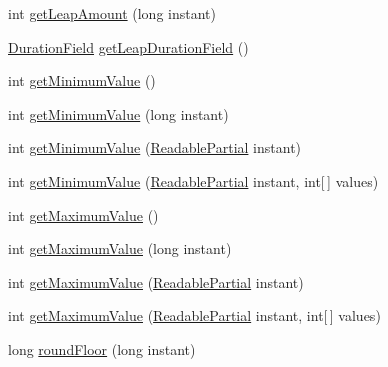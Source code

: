 \begin{DoxyCompactItemize}
\item 
int \hyperlink{classorg_1_1joda_1_1time_1_1field_1_1_zero_is_max_date_time_field_aa1d3542d95520b03b19518a8ac349bcf}{get\-Leap\-Amount} (long instant)
\item 
\hyperlink{classorg_1_1joda_1_1time_1_1_duration_field}{Duration\-Field} \hyperlink{classorg_1_1joda_1_1time_1_1field_1_1_zero_is_max_date_time_field_a1298f49bdc862df9959ef0637a5ca2a2}{get\-Leap\-Duration\-Field} ()
\item 
int \hyperlink{classorg_1_1joda_1_1time_1_1field_1_1_zero_is_max_date_time_field_ad7e9c4966783f6ac7ce0dce61a26dbc8}{get\-Minimum\-Value} ()
\item 
int \hyperlink{classorg_1_1joda_1_1time_1_1field_1_1_zero_is_max_date_time_field_aa6360ccef1e4208419d1f9a30b33a4b9}{get\-Minimum\-Value} (long instant)
\item 
int \hyperlink{classorg_1_1joda_1_1time_1_1field_1_1_zero_is_max_date_time_field_a9b5ef3ff3cfef568fb28818bc5bcbb70}{get\-Minimum\-Value} (\hyperlink{interfaceorg_1_1joda_1_1time_1_1_readable_partial}{Readable\-Partial} instant)
\item 
int \hyperlink{classorg_1_1joda_1_1time_1_1field_1_1_zero_is_max_date_time_field_a57b2addd5efaf0c10502f5ac20b919bb}{get\-Minimum\-Value} (\hyperlink{interfaceorg_1_1joda_1_1time_1_1_readable_partial}{Readable\-Partial} instant, int\mbox{[}$\,$\mbox{]} values)
\item 
int \hyperlink{classorg_1_1joda_1_1time_1_1field_1_1_zero_is_max_date_time_field_a842df6f02b166503e444fee5abc2362c}{get\-Maximum\-Value} ()
\item 
int \hyperlink{classorg_1_1joda_1_1time_1_1field_1_1_zero_is_max_date_time_field_a6ddf4be306ce234c14890c0bc97d9240}{get\-Maximum\-Value} (long instant)
\item 
int \hyperlink{classorg_1_1joda_1_1time_1_1field_1_1_zero_is_max_date_time_field_ad24403c65a0d8da95f9b3fada1861cf2}{get\-Maximum\-Value} (\hyperlink{interfaceorg_1_1joda_1_1time_1_1_readable_partial}{Readable\-Partial} instant)
\item 
int \hyperlink{classorg_1_1joda_1_1time_1_1field_1_1_zero_is_max_date_time_field_a877926a28a1156bab76ccec559b5d2a6}{get\-Maximum\-Value} (\hyperlink{interfaceorg_1_1joda_1_1time_1_1_readable_partial}{Readable\-Partial} instant, int\mbox{[}$\,$\mbox{]} values)
\item 
long \hyperlink{classorg_1_1joda_1_1time_1_1field_1_1_zero_is_max_date_time_field_a036742db40169291705fe496604c5978}{round\-Floor} (long instant)
\item 

\end{DoxyCompactItemize}

